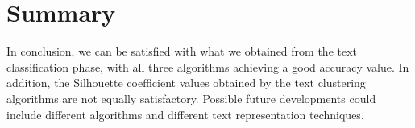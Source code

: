 \documentclass[fleqn,10pt]{SelfArx} %
\begin{document}
\section{Summary}
In conclusion, we can be satisfied with what we obtained from the text classification phase, with all three algorithms achieving a good accuracy value. In addition, the Silhouette coefficient values obtained by the text clustering algorithms are not equally satisfactory. Possible future developments could include different algorithms and different text representation techniques.


\nocite{*}
\printbibliography
\end{document}
